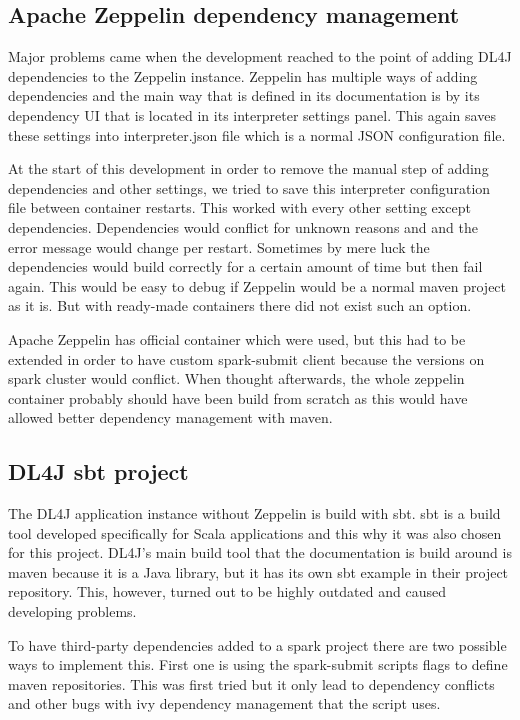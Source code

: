 \subsection{Apache Zeppelin dependency management}

Major problems came when the development reached to the point of adding DL4J dependencies to the Zeppelin instance.
Zeppelin has multiple ways of adding dependencies and the main way that is defined in its documentation is by its dependency UI that is located in its interpreter settings panel.
This again saves these settings into interpreter.json file which is a normal JSON configuration file.

At the start of this development in order to remove the manual step of adding dependencies and other settings, we tried to save this interpreter configuration file between container restarts.
This worked with every other setting except dependencies.
Dependencies would conflict for unknown reasons and and the error message would change per restart.
Sometimes by mere luck the dependencies would build correctly for a certain amount of time but then fail again.
This would be easy to debug if Zeppelin would be a normal maven project as it is.
But with ready-made containers there did not exist such an option.

Apache Zeppelin has official container which were used, but this had to be extended in order to have custom spark-submit client because the versions on spark cluster would conflict.
When thought afterwards, the whole zeppelin container probably should have been build from scratch as this would have allowed better dependency management with maven.

\subsection{DL4J sbt project}

The DL4J application instance without Zeppelin is build with sbt.
sbt is a build tool developed specifically for Scala applications and this why it was also chosen for this project.
DL4J's main build tool that the documentation is build around is maven because it is a Java library, but it has its own sbt example in their project repository.
This, however, turned out to be highly outdated and caused developing problems.

To have third-party dependencies added to a spark project there are two possible ways to implement this.
First one is using the spark-submit scripts flags to define maven repositories.
This was first tried but it only lead to dependency conflicts and other bugs with ivy dependency management that the script uses.

